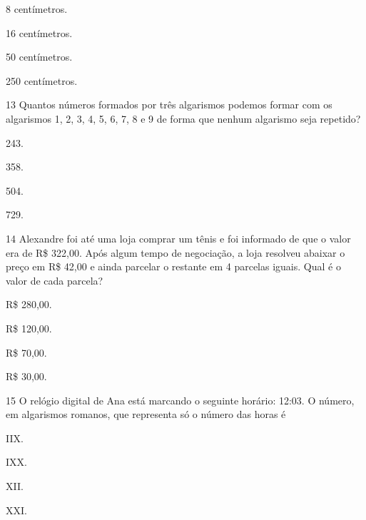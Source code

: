 \begin{escolha}
\item
  8 centímetros.
\item
  16 centímetros.
\item
  50 centímetros.
\item
  250 centímetros.
\end{escolha}


\num{13} Quantos números formados por três algarismos podemos formar com os
algarismos 1, 2, 3, 4, 5, 6, 7, 8 e 9 de forma que nenhum algarismo seja
repetido?

\begin{escolha}
\item
  243.
\item
  358.
\item
  504.
\item
  729.
\end{escolha}


\num{14} Alexandre foi até uma loja comprar um tênis e foi informado de que o valor
era de R\$ 322,00. Após algum tempo de negociação, a loja resolveu
abaixar o preço em R\$ 42,00 e ainda parcelar o restante em 4 parcelas iguais.
Qual é o valor de cada parcela?

\begin{escolha}
\item
  R\$ 280,00.
\item
  R\$ 120,00.
\item
  R\$ 70,00.
\item
  R\$ 30,00.
\end{escolha}


\num{15} O relógio digital de Ana está marcando o seguinte horário: 12:03.
O número, em algarismos romanos, que representa só o número das horas é

\begin{escolha}
\item
  IIX.
\item
  IXX.
\item
  XII.
\item
  XXI.
\end{escolha}


